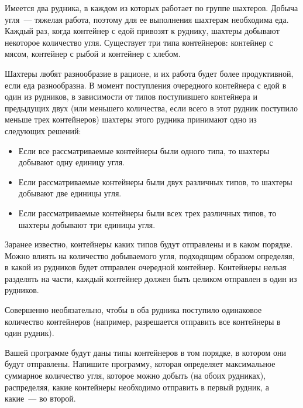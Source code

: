 Имеется два рудника, в каждом из которых работает по группе шахтеров. Добыча угля~--- тяжелая работа,
поэтому для ее выполнения шахтерам необходима еда. Каждый раз, когда контейнер с едой привозят к
руднику, шахтеры добывают некоторое количество угля. Существует три типа контейнеров: контейнер с
мясом, контейнер с рыбой и контейнер с хлебом.

Шахтеры любят разнообразие в рационе, и их работа будет более продуктивной, если еда разнообразна.
В момент поступления очередного контейнера с едой в один из рудников, в зависимости от типов
поступившего контейнера и предыдущих двух (или меньшего количества, если всего в этот рудник
поступило меньше трех контейнеров) шахтеры этого рудника принимают одно из следующих решений: 


\begin{itemize}
\item Если все рассматриваемые контейнеры были одного типа, то шахтеры добывают одну единицу угля.

\item Если рассматриваемые контейнеры были двух различных типов, то шахтеры добывают две
единицы угля.

\item Если рассматриваемые контейнеры были всех трех различных типов, то шахтеры добывают три единицы угля.
\end{itemize}

Заранее известно, контейнеры каких типов будут отправлены и в каком порядке. Можно влиять на
количество добываемого угля, подходящим образом определяя, в какой из рудников будет отправлен
очередной контейнер. Контейнеры нельзя разделять на части, каждый контейнер должен быть целиком
отправлен в один из рудников.

Совершенно необязательно, чтобы в оба рудника поступило одинаковое количество контейнеров
(например, разрешается отправить все контейнеры в один рудник). 

Вашей программе будут даны типы контейнеров в том порядке, в котором они будут отправлены. Напишите программу, которая определяет максимальное суммарное количество угля, которое можно
добыть (на обоих рудниках), распределяя, какие контейнеры необходимо отправить в первый рудник, а
какие~--- во второй. 